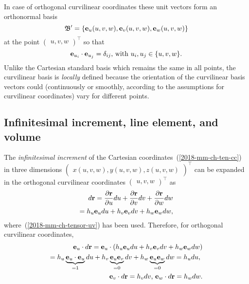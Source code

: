 In case of orthogonal curvilinear coordinates these unit vectors form an orthonormal basis
\begin{equation}
{\frak B}'=\left\{ {\bf e}_{u}(u,v,w), {\bf e}_{v}(u,v,w),{\bf e}_{w} (u,v,w)\right\}
\label{2018-mm-ch-tensor-ob}
\end{equation}
at the point $\begin{pmatrix}u,v,w\end{pmatrix}^\intercal$ so that
\begin{equation}
{\bf e}_{u_i} \cdot {\bf e}_{u_j} = \delta_{ij}
\text{, with }
u_i,u_j \in \{u,v,w\}.
\label{2018-mm-ch-tensor-uvob}
\end{equation}
Unlike the Cartesian standard basis which remains the same in all points,
the curvilinear basis is {\em locally} defined because the orientation of the curvilinear basis vectors
could (continuously or smoothly, according to the assumptions for curvilinear coordinates) vary for different points.

\subsection{Infinitesimal increment, line element, and volume}
\label{2018-mm-ch-ctensor-volumeclc}

The {\em infinitesimal increment}
of the Cartesian coordinates~(\ref{2018-mm-ch-ten-cc}) in three dimensions
$
\begin{pmatrix}
x(u,v,w), y(u,v,w), z(u,v,w)
\end{pmatrix}^\intercal
$
can be expanded
in
the orthogonal curvilinear coordinates
$\begin{pmatrix}
u, v, w
\end{pmatrix}^\intercal$ as
\begin{equation}
\begin{split}
d {\bf r}
=
\frac{\partial  {\bf r}}{\partial u} du
+ \frac{\partial  {\bf r}}{\partial v}dv
+ \frac{\partial  {\bf r}}{\partial w}dw
\\
=
{ h_u }{\bf e}_u   du + { h_v }{\bf e}_v   dv + { h_w } {\bf e}_w dw
,
\end{split}
\label{2018-mm-ch-tensor-infincr}
\end{equation}
where~(\ref{2018-mm-ch-tensor-uv}) has been used.
Therefore, for orthogonal curvilinear coordinates,
\begin{equation}
\begin{split}
{\bf e}_u \cdot d {\bf r} =
{\bf e}_u \cdot \left({ h_u }{\bf e}_u   du + { h_v }{\bf e}_v   dv + { h_w } {\bf e}_w dw \right) \\
=
{ h_u } \underbrace{{\bf e}_u \cdot {\bf e}_u}_{=1} du
+ { h_v } \underbrace{{\bf e}_u {\bf e}_v}_{=0}   dv
+ { h_w } \underbrace{{\bf e}_u {\bf e}_w}_{=0} dw
=  { h_u } du \text{, }
\\
{\bf e}_v \cdot d {\bf r} =   { h_v } dv \text{,  }
{\bf e}_w \cdot d {\bf r} =   { h_w } dw
.
\end{split}
\label{2018-mm-ch-tensor-etdr}
\end{equation}

